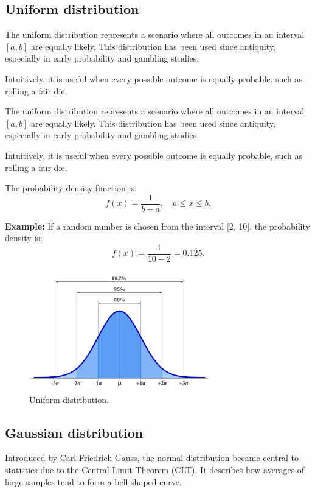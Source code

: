 \documentclass{book}
\begin{document}
\newpage
\subsection{Uniform distribution}
The uniform distribution represents a scenario where all outcomes in an interval $[a, b]$ are equally likely. This distribution has been used since antiquity, especially in early probability and gambling studies.

Intuitively, it is useful when every possible outcome is equally probable, such as rolling a fair die.

The uniform distribution represents a scenario where all outcomes in an interval $[a, b]$ are equally likely. This distribution has been used since antiquity, especially in early probability and gambling studies.

Intuitively, it is useful when every possible outcome is equally probable, such as rolling a fair die.

The probability density function is:
\begin{equation}
    f(x) = \frac{1}{b-a}, \quad a \leq x \leq b.
\end{equation}

\textbf{Example:} If a random number is chosen from the interval [2, 10], the probability density is:
\begin{equation}
    f(x) = \frac{1}{10-2} = 0.125.
\end{equation}

\begin{figure}[ht]
    \centering
    \includegraphics[width=0.7\textwidth]{figures/gaussian.png}
    \caption{Uniform distribution.}
    \label{fig:random}
\end{figure}

\newpage
\subsection{Gaussian distribution}
Introduced by Carl Friedrich Gauss, the normal distribution became central to statistics due to the Central Limit Theorem (CLT). It describes how averages of large samples tend to form a bell-shaped curve.
\end{document}
